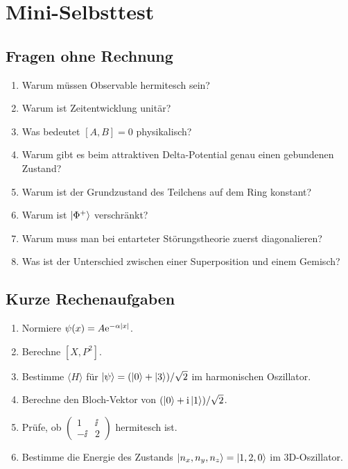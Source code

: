 \section{Mini-Selbsttest}

\subsection{Fragen ohne Rechnung}

\begin{enumerate}
    \item Warum müssen Observable hermitesch sein?
    \item Warum ist Zeitentwicklung unitär?
    \item Was bedeutet $[A,B]=0$ physikalisch?
    \item Warum gibt es beim attraktiven Delta-Potential genau einen gebundenen Zustand?
    \item Warum ist der Grundzustand des Teilchens auf dem Ring konstant?
    \item Warum ist $\left|\Phi^+\right\rangle$ verschränkt?
    \item Warum muss man bei entarteter Störungstheorie zuerst diagonalieren?
    \item Was ist der Unterschied zwischen einer Superposition und einem Gemisch?
\end{enumerate}

\subsection{Kurze Rechenaufgaben}

\begin{enumerate}
    \item Normiere $\psi(x)=A\mathrm{e}^{-\alpha|x|}$.
    \item Berechne $[X,P^2]$.
    \item Bestimme $\langle H\rangle$ für $\left|\psi\right\rangle=(\left|0\right\rangle+\left|3\right\rangle)/\sqrt2$ im harmonischen Oszillator.
    \item Berechne den Bloch-Vektor von $(\left|0\right\rangle+\mathrm{i}\left|1\right\rangle)/\sqrt2$.
    \item Prüfe, ob $\begin{pmatrix}1&\ii\\-\ii&2\end{pmatrix}$ hermitesch ist.
    \item Bestimme die Energie des Zustands $\left|n_x,n_y,n_z\right\rangle=\left|1,2,0\right\rangle$ im 3D-Oszillator.
\end{enumerate}

